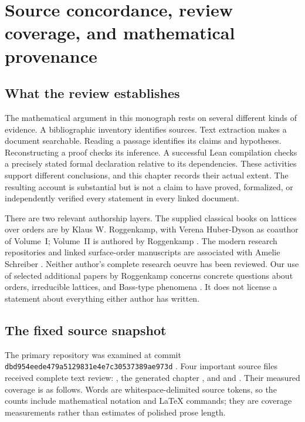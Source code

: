 \chapter{Source concordance, review coverage, and mathematical provenance}
\label{ch:source-concordance}

\section{What the review establishes}

The mathematical argument in this monograph rests on several different kinds
of evidence. A bibliographic inventory identifies sources. Text extraction
makes a document searchable. Reading a passage identifies its claims and
hypotheses. Reconstructing a proof checks its inference. A successful Lean
compilation checks a precisely stated formal declaration relative to its
dependencies. These activities support different conclusions, and this
chapter records their actual extent. The resulting account is substantial
but is not a claim to have proved, formalized, or independently verified every
statement in every linked document.

There are two relevant authorship layers. The supplied classical books on
lattices over orders are by Klaus W. Roggenkamp, with Verena Huber-Dyson as
coauthor of Volume~I; Volume~II is authored by Roggenkamp
\cite{RoggenkampHuberDyson1970,v2Roggenkamp1970II}. The modern research
repositories and linked surface-order manuscripts are associated with
Amelie Schreiber \cite{GRHRepo,SchreiberSurfaceI,SchreiberSurfaceII}.
Neither author's complete research oeuvre has been reviewed. Our use of
selected additional papers by Roggenkamp concerns concrete questions about
orders, irreducible lattices, and Bass-type phenomena
\cite{Roggenkamp1969Irreducible,Roggenkamp1969Separable,v2RoggenkampBass1971}.
It does not license a statement about everything either author has written.

\section{The fixed source snapshot}

The primary repository was examined at commit
\texttt{dbd954eede\allowbreak{}479a512983\allowbreak{}1e4e7c3053\allowbreak{}7389ae973d}
\cite{GRHRepo}. Four important source files received complete text review:
, the generated chapter
, and
 and . Their measured
coverage is as follows. Words are whitespace-delimited source tokens, so the
counts include mathematical notation and LaTeX commands; they are coverage
measurements rather than estimates of polished prose length.

